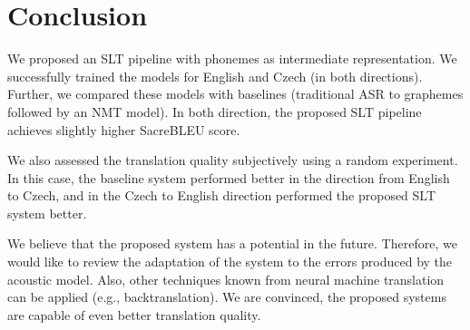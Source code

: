\section{Conclusion}
\label{slt:conclusion}
We proposed an SLT pipeline with phonemes as intermediate representation. We successfully trained the models for English and Czech (in both directions). Further, we compared these models with baselines (traditional ASR to graphemes followed by an NMT model). In both direction, the proposed SLT pipeline achieves slightly higher SacreBLEU score. 

We also assessed the translation quality subjectively using a random experiment. In this case, the baseline system performed better in the direction from English to Czech, and in the Czech to English direction performed the proposed SLT system better. 

We believe that the proposed system has a potential in the future. Therefore, we would like to review the adaptation of the system to the errors produced by the acoustic model. Also, other techniques known from neural machine translation can be applied (e.g., backtranslation). We are convinced, the proposed systems are capable of even better translation quality. 